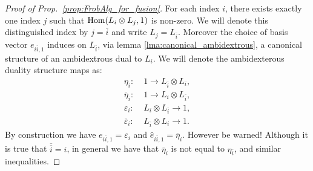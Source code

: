 \documentclass{amsart}
\begin{document}
\begin{proof}[Proof of Prop.~\ref{prop:FrobAlg_for_fusion}]
For each index $i$, there exists exactly one index $j$ such that $\operatorname{Hom}(L_i \otimes L_j, 1)$ is non-zero. We will denote this distinguished index by $j = \overline{i}$ and write $L_j = {L}_{\overline{i}}$. Moreover the choice of basis vector $e_{i \overline{i}, 1}$ induces on ${L}_{\overline{i}}$, via lemma \ref{lma:canonical_ambidextrous}, a canonical structure of an ambidextrous dual to $L_i$. We will denote the ambidexterous duality structure maps as: 
\begin{align*}
	\eta_i: 					& \; 1 \to L_{\overline{i}} \otimes L_i, \\
	\overline{\eta}_i: 		& \;  1 \to   L_i \otimes L_{\overline{i}}, \\
	\varepsilon_i: 			& \;  L_i \otimes L_{\overline{i}} \to 1, \\
	\overline{\varepsilon}_i: & \;   L_{\overline{i}} \otimes L_i  \to 1. 
\end{align*}
By construction we have $e_{i \overline{i}, 1} = \varepsilon_i$ and $\hat{e}_{i \overline{i}, 1} = \overline{\eta}_i$. However be warned! Although it is true that $\overline{\overline{i}} = i$, in general we have that $\overline{\eta}_i$ is not equal to $\eta_{\overline{i}}$, and similar inequalities. 



%


\end{proof}
\end{document}
